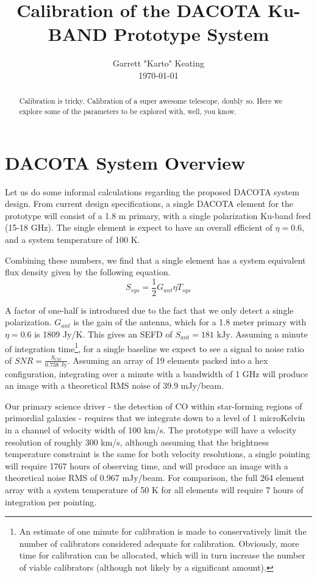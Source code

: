 \documentclass[preprint]{aastex}
\begin{document}
\title{Calibration of the DACOTA Ku-BAND Prototype System}
\author{Garrett "Karto" Keating \\ \today}

\begin{abstract} Calibration is tricky. Calibration of a super awesome telescope, doubly so. Here we explore some of the parameters to be explored with, well, you know.
\end{abstract}

\section{DACOTA System Overview}\label{secoverview}
Let us do some informal calculations regarding the proposed DACOTA system design. From current design specifications, a single DACOTA element for the prototype will consist of a 1.8 m primary, with a single polarization Ku-band feed (15-18 GHz). The single element is expect to have an overall efficient of $\eta=0.6$, and a system temperature of 100 K.

Combining these numbers, we find that a single element has a system equivalent flux density given by the following equation.
\begin{equation} \label{eqsefd}
S_{sys}=\frac{1}{2}G_{ant}{\eta}T_{sys}
\end{equation}

\noindent A factor of one-half is introduced due to the fact that we only detect a single polarization. $G_{ant}$ is the gain of the antenna, which for a 1.8 meter primary with $\eta=0.6$ is 1809 Jy/K. This gives an SEFD of $S_{ant}=181\text{ kJy}$. Assuming a minute of integration time\footnote{An estimate of one minute for calibration is made to conservatively limit the number of calibrators considered adequate for calibration. Obviously, more time for calibration can be allocated, which will in turn increase the number of viable calibrators (although not likely by a significant amount).}, for a single baseline we expect to see a signal to noise ratio of $SNR=\frac{S_{Cal}}{0.738\text{ Jy}}$. Assuming an array of 19 elements packed into a hex configuration, integrating over a minute with a bandwidth of 1 GHz will produce an image with a theoretical RMS noise of 39.9 mJy/beam. 

Our primary science driver - the detection of CO within star-forming regions of primordial galaxies - requires that we integrate down to a level of 1 microKelvin in a channel of velocity width of 100 km/s. The prototype will have a velocity resolution of roughly 300 km/s, although assuming that the brightness temperature constraint is the same for both velocity resolutions, a single pointing will require 1767 hours of observing time, and will produce an image with a theoretical noise RMS of 0.967 mJy/beam. For comparison, the full 264 element array with a system temperature of 50 K for all elements will require 7 hours of integration per pointing.
\end{document}
